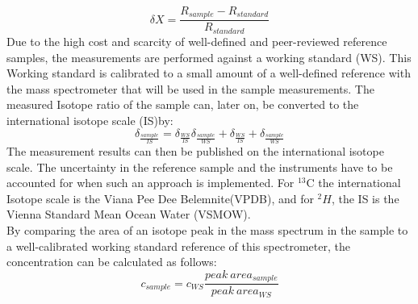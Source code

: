 \begin{equation}
\delta X = \frac{R_{sample} - R_{standard}}{R_{standard}}
\end{equation}
Due to the high cost and scarcity of well-defined and peer-reviewed reference samples, the measurements are performed against a working standard (WS). This Working standard is calibrated to a small amount of a well-defined reference with the mass spectrometer that will be used in the sample measurements.
The measured Isotope ratio of the sample can, later on, be converted to the international isotope scale (IS)by: 
\begin{equation}
\delta_{\frac{sample}{IS}} = \delta_{\frac{WS}{IS}} \delta_{\frac {sample}{WS}} + \delta_{\frac {WS}{IS}} + \delta_{\frac {sample} {WS}}
\end{equation}
The measurement results can then be published on the international isotope scale. The uncertainty in the reference sample and the instruments have to be accounted for when such an approach is implemented. For $^{13}$C
the international Isotope scale is the Viana Pee Dee Belemnite(VPDB), and for $^{2}H$, the IS is the Vienna Standard Mean Ocean Water (VSMOW).\\
By comparing the area of an isotope peak in the mass spectrum in the sample to a well-calibrated working standard reference of this spectrometer, the concentration can be calculated as follows:
\begin{equation}
c_{sample} = c_{WS} \frac{peak\  area_{sample}}{peak\  area_{WS}}
\end{equation}

